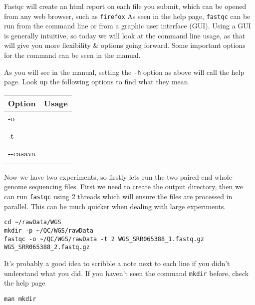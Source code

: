 \begin{note}
Fastqc will create an html report on each file you submit, which can be opened from any web browser, such as \texttt{firefox}
As seen in the help page, \texttt{fastqc} can be run from the command line or from a graphic user interface (GUI).
Using a GUI is generally intuitive, so today we will look at the command line usage, as that will give you more flexibility \& options going forward.
Some important options for the command can be seen in the manual.\\
\end{note}
\begin{steps}
As you will see in the manual, setting the \texttt{-h} option as above will call the help page.
Look up the following options to find what they mean. \\
\begin{center}
\begin{tabular}[h]{|p{4cm}|p{8cm}|}
  \hline
  \textbf{Option} & \textbf{Usage} \\
  \hline
  -o & \\
   & \\
   \hline
  -t & \\
   & \\
   \hline
   -{}-casava & \\
   & \\
   \hline
\end{tabular}
\end{center}
\end{steps}

\begin{steps}
Now we have two experiments, so firstly lets run the two paired-end whole-genome sequencing files. First we need to create the output directory, then we can run \texttt{fastqc} using 2 threads which will ensure the files are processed in parallel.
This can be much quicker when dealing with large experiments.
\begin{lstlisting}
cd ~/rawData/WGS
mkdir -p ~/QC/WGS/rawData
fastqc -o ~/QC/WGS/rawData -t 2 WGS_SRR065388_1.fastq.gz WGS_SRR065388_2.fastq.gz
\end{lstlisting}
\end{steps}
It's probably a good idea to scribble a note next to each line if you didn't understand what you did.
If you haven't seen the command \texttt{mkdir} before, check the help page
\begin{lstlisting}
man mkdir
\end{lstlisting}


